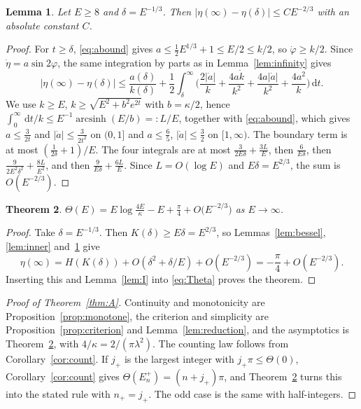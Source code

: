 \documentclass[11pt]{amsart}
\newtheorem{theorem}{Theorem}[section]
\newtheorem{lemma}[theorem]{Lemma}
\theoremstyle{definition}
\newcommand{\dd}{\,\mathrm{d}}
\DeclareMathOperator{\arcsinh}{arcsinh}
\begin{document}
\begin{lemma}\label{lem:outer}
Let $E\ge8$ and $\delta=E^{-1/3}$. Then $|\eta(\infty)-\eta(\delta)|\le C E^{-2/3}$ with an absolute constant $C$.
\end{lemma}

\begin{proof}
For $t\ge\delta$, \eqref{eq:abound} gives $a\le\frac12E^{1/3}+1\le E/2\le k/2$, so $\dot\varphi\ge k/2$. Since $\dot\eta=a\sin2\varphi$, the same integration by parts as in Lemma~\ref{lem:infinity} gives
\[
|\eta(\infty)-\eta(\delta)|\le\frac{a(\delta)}{k(\delta)}+\frac12\int_\delta^\infty\Big(\frac{2|\dot a|}{k}+\frac{4a\dot k}{k^2}+\frac{4a|\dot a|}{k^2}+\frac{4a^2}{k}\Big)\dd t .
\]
We use $k\ge E$, $k\ge\sqrt{E^2+b^2e^{2t}}$ with $b=\kappa/2$, hence $\int_0^\infty\dd t/k\le E^{-1}\arcsinh(E/b)=:L/E$, together with \eqref{eq:abound}, which gives $a\le\frac3{2t}$ and $|\dot a|\le\frac3{2t^2}$ on $(0,1]$ and $a\le\frac65$, $|\dot a|\le\frac32$ on $[1,\infty)$. The boundary term is at most $(\frac1{2\delta}+1)/E$. The four integrals are at most $\frac{3}{2E\delta}+\frac{3L}{E}$, then $\frac{6}{E\delta}$, then $\frac{9}{2E^2\delta^2}+\frac{8L}{E^2}$, and then $\frac{9}{E\delta}+\frac{6L}{E}$. Since $L=O(\log E)$ and $E\delta=E^{2/3}$, the sum is $O(E^{-2/3})$.
\end{proof}

\begin{theorem}\label{thm:Theta}
$\Theta(E)=E\log\frac{4E}{\kappa}-E+\frac\pi4+O\big(E^{-2/3}\big)$ as $E\to\infty$.
\end{theorem}

\begin{proof}
Take $\delta=E^{-1/3}$. Then $K(\delta)\ge E\delta=E^{2/3}$, so Lemmas~\ref{lem:bessel}, \ref{lem:inner} and~\ref{lem:outer} give
\[
\eta(\infty)=H(K(\delta))+O(\delta^2+\delta/E)+O(E^{-2/3})=-\frac\pi4+O(E^{-2/3}).
\]
Inserting this and Lemma~\ref{lem:I} into \eqref{eq:Theta} proves the theorem.
\end{proof}

\begin{proof}[Proof of Theorem~\ref{thm:A}]
Continuity and monotonicity are Proposition~\ref{prop:monotone}, the criterion and simplicity are Proposition~\ref{prop:criterion} and Lemma~\ref{lem:reduction}, and the asymptotics is Theorem~\ref{thm:Theta}, with $4/\kappa=2/(\pi\lambda^2)$. The counting law follows from Corollary~\ref{cor:count}. If $j_+$ is the largest integer with $j_+\pi\le\Theta(0)$, Corollary~\ref{cor:count} gives $\Theta(E_n^+)=(n+j_+)\pi$, and Theorem~\ref{thm:Theta} turns this into the stated rule with $n_+=j_+$. The odd case is the same with half-integers.
\end{proof}
\end{document}
